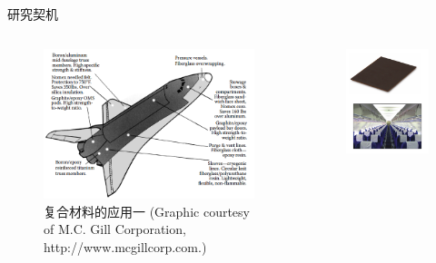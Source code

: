 \documentclass{beamer}
\begin{document}
\begin{frame}{研究契机}
	\begin{columns}
		\begin{column}{0.6\textwidth}
			\begin{figure}
				\includegraphics[width=1.0\linewidth]{fig/part0/space-shuttle.png}
				\caption{复合材料的应用一 (Graphic courtesy of M.C. Gill Corporation,
				http://www.mcgillcorp.com.)}
			\end{figure}
		\end{column}
		\begin{column}{0.4\textwidth}
			\begin{figure}
				\includegraphics[width=1.0\linewidth]{fig/part0/laminate_product.png}

\end{figure}
\end{column}
\end{columns}
\end{frame}
\end{document}
